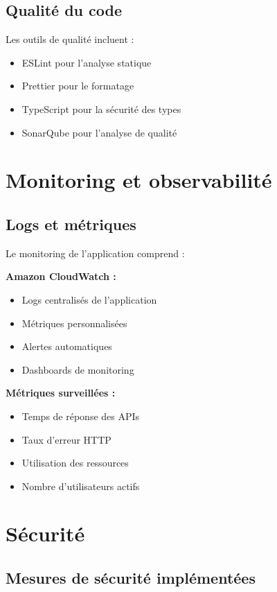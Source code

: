 \subsection{Qualité du code}

Les outils de qualité incluent :
\begin{itemize}
    \item ESLint pour l'analyse statique
    \item Prettier pour le formatage
    \item TypeScript pour la sécurité des types
    \item SonarQube pour l'analyse de qualité
\end{itemize}

\section{Monitoring et observabilité}

\subsection{Logs et métriques}

Le monitoring de l'application comprend :

\textbf{Amazon CloudWatch :}
\begin{itemize}
    \item Logs centralisés de l'application
    \item Métriques personnalisées
    \item Alertes automatiques
    \item Dashboards de monitoring
\end{itemize}

\textbf{Métriques surveillées :}
\begin{itemize}
    \item Temps de réponse des APIs
    \item Taux d'erreur HTTP
    \item Utilisation des ressources
    \item Nombre d'utilisateurs actifs
\end{itemize}

\section{Sécurité}

\subsection{Mesures de sécurité implémentées}

